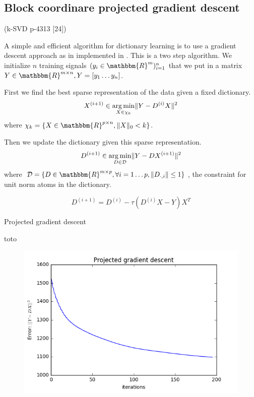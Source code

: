 \documentclass[a4paper,11pt]{article}
\newcommand{\RR}{\mathbbm{R}} %
\DeclarePairedDelimiter\norm{\lVert}{\rVert} %
\DeclareMathOperator*{\argmin}{arg\,min} %
\begin{document}
\subsection{Block coordinare projected gradient descent}
\cite{olshausen97} (k-SVD p-4313 [24])

A simple and efficient algorithm for dictionary learning is to use a gradient descent approach as in implemented in \cite{nt4}.
This is a two step algorithm.
We initialize $n$ training signals $(y_i \in \RR^m)_{i=1}^{n}$
that we put in a matrix $Y \in \RR^{m \times n}, Y = [y_1 \ldots y_n]$.

First we find the best sparse representation of the data given a fixed dictionary.
$$ X^{(i+1)} \in \argmin_{X \in \chi_k} \norm{Y - D^{(i)}X}^2 $$
where $\chi_k = \{ X \in \RR^{p \times n}, \norm{X}_0<k \}$.

Then we update the dictionary given this sparse representation.
$$ D^{(i+1)} \in \argmin_{D \in \mathcal{D}} \norm{Y - DX^{(i+1)}}^2 $$
where $\mathcal{D} = \{ D \in \RR^{m \times p}, \forall i=1 \ldots p, \norm{D_{\cdot,i}} \leq 1 \}$, the constraint for unit norm atoms in the dictionary.


$$ D^{(i+1)} = D^{(i)} - \tau (D^{(i)}X - Y) X^T $$

\begin{algorithm}
\caption{Projected gradient descent}\label{pgd}
\begin{algorithmic}[1]
\State toto
\end{algorithmic}
\end{algorithm}

\begin{figure}[!htbp]
\centering
  \includegraphics[width=\linewidth]{projected_gradient_descent.png}
\end{figure}
\end{document}

